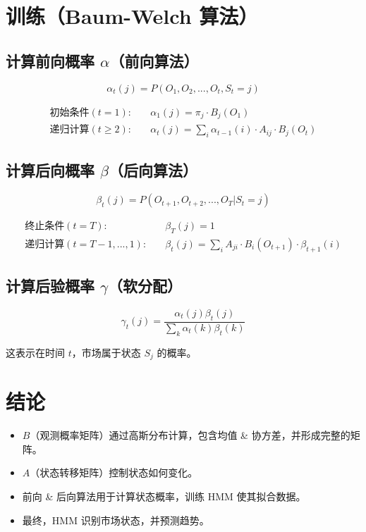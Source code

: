 \documentclass{article}
\begin{document}
\section{训练（Baum-Welch 算法）}

\subsection{计算前向概率 $\alpha$（前向算法）}

\[
\alpha_t(j) = P(O_1, O_2, ..., O_t, S_t = j)
\]

\begin{align}
    \text{初始条件} (t=1): & \quad \alpha_1(j) = \pi_j \cdot B_j(O_1) \\
    \text{递归计算} (t \geq 2): & \quad \alpha_t(j) = \sum_{i} \alpha_{t-1}(i) \cdot A_{ij} \cdot B_j(O_t)
\end{align}

\subsection{计算后向概率 $\beta$（后向算法）}

\[
\beta_t(j) = P(O_{t+1}, O_{t+2}, ..., O_T | S_t = j)
\]

\begin{align}
    \text{终止条件} (t=T): & \quad \beta_T(j) = 1 \\
    \text{递归计算} (t=T-1, ..., 1): & \quad \beta_t(j) = \sum_{i} A_{ji} \cdot B_i(O_{t+1}) \cdot \beta_{t+1}(i)
\end{align}

\subsection{计算后验概率 $\gamma$（软分配）}

\[
\gamma_t(j) = \frac{\alpha_t(j) \beta_t(j)}{\sum_k \alpha_t(k) \beta_t(k)}
\]

这表示在时间 $t$，市场属于状态 $S_j$ 的概率。

\section{结论}

\begin{itemize}
    \item $B$（观测概率矩阵）通过高斯分布计算，包含均值 \& 协方差，并形成完整的矩阵。
    \item $A$（状态转移矩阵）控制状态如何变化。
    \item 前向 \& 后向算法用于计算状态概率，训练 HMM 使其拟合数据。
    \item 最终，HMM 识别市场状态，并预测趋势。
\end{itemize}
\end{document}
